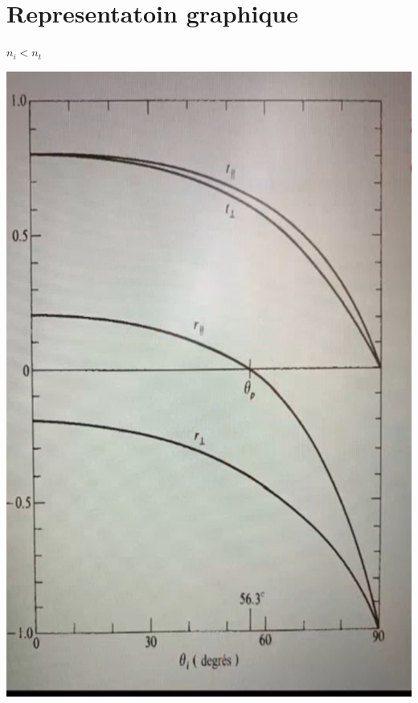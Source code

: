 \documentclass[12pt]{book}
\begin{document}
        \section{Representatoin graphique}
            \underline{$n_i < n_t$} 
                \begin{center}
                    \begin{minipage}{0.24\linewidth}
                        \includegraphics[width =\linewidth]{pic/graphe1.png}
                    \end{minipage}
                    \begin{minipage}{0.49\linewidth}

\end{minipage}
\end{center}
\end{document}
